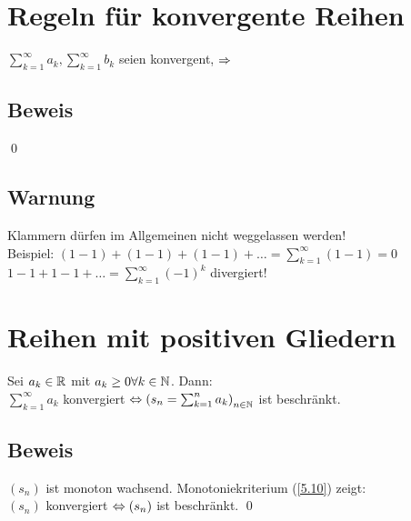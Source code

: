 \section{Regeln für konvergente Reihen}\label{7.5}
$\sum_{k=1}^\infty a_k, \sum_{k=1}^\infty b_k$ seien konvergent, $\Rightarrow$

\subsection*{Beweis}
 \qed

\subsection*{Warnung}
Klammern dürfen im Allgemeinen nicht weggelassen werden!\\
Beispiel: $(1-1)+(1-1)+(1-1)+\ldots=\sum_{k=1}^\infty (1-1) = 0$
$1-1+1-1+\ldots=\sum_{k=1}^\infty (-1)^k$ divergiert!

\section{Reihen mit positiven Gliedern}\label{7.6}
Sei $a_k \in \mathbb{R}$ mit $a_k \ge 0 \forall k \in \mathbb{N}$. Dann:\\
$\sum_{k=1}^\infty a_k$ konvergiert $\Leftrightarrow \left( s_n=\sum_{k=1}^n a_k \right)_{n \in \mathbb{N}}$ ist beschränkt.

\subsection*{Beweis}
$(s_n)$ ist monoton wachsend. Monotoniekriterium (\ref{5.10}) zeigt:\\
$(s_n)$ konvergiert $\Leftrightarrow (s_n)$ ist beschränkt. \qed

